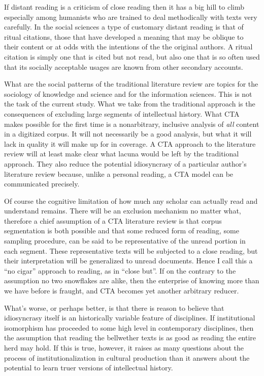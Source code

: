 \documentclass[]{book}
\theoremstyle{definition}
\theoremstyle{definition}
\theoremstyle{definition}
\theoremstyle{remark}
\begin{document}
If distant reading is a criticism of close reading then it has a big
hill to climb especially among humanists who are trained to deal
methodically with texts very carefully. In the social sciences a type of
customary distant reading is that of ritual citations, those that have
developed a meaning that may be oblique to their content or at odds with
the intentions of the the original authors. A ritual citation is simply
one that is cited but not read, but also one that is so often used that
its socially acceptable usages are known from other secondary accounts.

What are the social patterns of the traditional literature review are
topics for the sociology of knowledge and science and for the
information sciences. This is not the task of the current study. What we
take from the traditional approach is the consequences of excluding
large segments of intellectual history. What CTA makes possible for the
first time is a nonarbitrary, inclusive analysis of \emph{all} content
in a digitized corpus. It will not necessarily be a good analysis, but
what it will lack in quality it will make up for in coverage. A CTA
approach to the literature review will at least make clear what lacuna
would be left by the traditional approach. They also reduce the
potential idiosyncrasy of a particular author's literature review
because, unlike a personal reading, a CTA model can be communicated
precisely.

Of course the cognitive limitation of how much any scholar can actually
read and understand remains. There will be an exclusion mechanism no
matter what, therefore a chief assumption of a CTA literature review is
that corpus segmentation is both possible and that some reduced form of
reading, some sampling procedure, can be said to be representative of
the unread portion in each segment. These representative texts will be
subjected to a close reading, but their interpretation will be
generalized to unread documents. Hence I call this a ``no cigar''
approach to reading, as in ``close but''. If on the contrary to the
assumption no two snowflakes are alike, then the enterprise of knowing
more than we have before is fraught, and CTA becomes yet another
arbitrary reducer.

What's worse, or perhaps better, is that there is reason to believe that
idiosyncrasy itself is an historically variable feature of disciplines.
If institutional isomorphism has proceeded to some high level in
contemporary disciplines, then the assumption that reading the
bellwether texts is as good as reading the entire herd may hold. If this
is true, however, it raises as many questions about the process of
institutionalization in cultural production than it answers about the
potential to learn truer versions of intellectual history.
\end{document}
